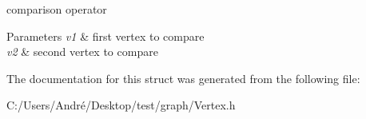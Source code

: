 comparison operator 


\begin{DoxyParams}{Parameters}
{\em v1} & first vertex to compare \\
\hline
{\em v2} & second vertex to compare \\
\hline
\end{DoxyParams}


The documentation for this struct was generated from the following file\+:\begin{DoxyCompactItemize}
\item 
C\+:/\+Users/\+André/\+Desktop/test/graph/Vertex.\+h\end{DoxyCompactItemize}
